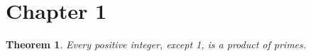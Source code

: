 \documentclass[10pt]{article}
\theoremstyle{plain}
\newtheorem{Thm}{Theorem}
\begin{document}
\maketitle

\section*{Chapter 1}

\begin{Thm}
Every positive integer, except 1, is a product of primes. 
\end{Thm}
\end{document}
